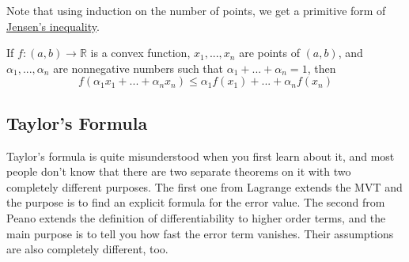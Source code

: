   Note that using induction on the number of points, we get a primitive form of \hyperref[thm:jensen]{Jensen's inequality}. 

  \begin{lemma}
    \label{thm:jensen}
    If $f: (a, b) \to \mathbb{R}$ is a convex function, $x_1, ..., x_n$ are points of $(a, b)$, and $\alpha_1, ..., \alpha_n$ are nonnegative numbers such that $\alpha_1 + ... + \alpha_n = 1$, then 
    \begin{equation}
      f(\alpha_1 x_1 + ... + \alpha_n x_n) \leq \alpha_1 f(x_1) + ... + \alpha_n f(x_n)
    \end{equation}
  \end{lemma}

\subsection{Taylor's Formula} 

  Taylor's formula is quite misunderstood when you first learn about it, and most people don't know that there are two separate theorems on it with two completely different purposes. The first one from Lagrange extends the MVT and the purpose is to find an explicit formula for the error value. The second from Peano extends the definition of differentiability to higher order terms, and the main purpose is to tell you how fast the error term vanishes. Their assumptions are also completely different, too. 

